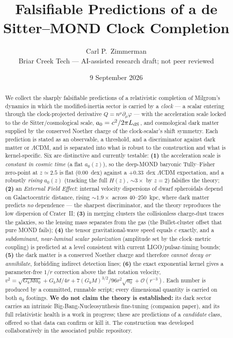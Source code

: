 \documentclass[11pt,letterpaper]{article}
\title{Falsifiable Predictions of a de Sitter--MOND Clock Completion}
\author{Carl P.\ Zimmerman\\ \small Briar Creek Tech --- AI-assisted research draft; not peer reviewed}
\date{9 September 2026}
\begin{document}
\maketitle

\begin{abstract}
We collect the sharply falsifiable predictions of a relativistic completion of Milgrom's dynamics in which
the modified-inertia sector is carried by a \emph{clock} --- a scalar entering through the clock-projected
derivative $Q=n^\mu\partial_\mu\varphi$ --- with the acceleration scale locked to the de Sitter/cosmological
scale, $a_0=c^2/2\pi L_{\rm dS}$, and cosmological dark matter supplied by the conserved Noether charge of
the clock-scalar's shift symmetry. Each prediction is stated as an observable, a threshold, and a
discriminator against dark matter or $\Lambda$CDM, and is separated into what is robust to the construction
and what is kernel-specific. Six are distinctive and currently testable: \textbf{(1)} the acceleration scale
is \emph{constant in cosmic time} (a flat $a_0(z)$), so the deep-MOND baryonic Tully--Fisher zero-point at
$z\simeq2.5$ is flat ($0.00$~dex) against a $+0.33$~dex $\Lambda$CDM expectation, and a robustly \emph{rising}
$a_0(z)$ (tracking the full $H(z)$, $\sim3\times$ by $z=2$) falsifies the theory; \textbf{(2)} an
\emph{External Field Effect}: internal velocity dispersions of dwarf spheroidals depend on Galactocentric
distance, rising $\sim\!1.9\times$ across $40$--$250$~kpc, where dark matter predicts \emph{no} dependence ---
the sharpest discriminator, and the theory reproduces the low dispersion of Crater~II; \textbf{(3)} in merging
clusters the collisionless charge-dust traces the galaxies, so the lensing mass separates from the gas (the
Bullet-cluster offset that pure MOND fails); \textbf{(4)} the tensor gravitational-wave speed equals $c$
exactly, and a \emph{subdominant, near-luminal scalar polarization} (amplitude set by the clock--metric
coupling) is predicted at a level consistent with current LIGO/pulsar-timing bounds; \textbf{(5)} the dark
matter is a conserved Noether charge and therefore \emph{cannot decay or annihilate}, forbidding indirect
detection lines; \textbf{(6)} the exact exponential kernel gives a parameter-free $1/r$ correction above the
flat rotation velocity, $v^2=\sqrt{G_bMa_0}+G_bM/4r+7(G_bM)^{3/2}/96r^2\sqrt{a_0}+\mathcal{O}(r^{-3})$. Each
number is produced by a committed, runnable script; every dimensional quantity is carried on both $a_0$
footings. \textbf{We do not claim the theory is established:} its dark sector carries an intrinsic
Big-Bang-Nucleosynthesis fine-tuning (companion paper), and its full relativistic health is a work in
progress; these are predictions of a \emph{candidate} class, offered so that data can confirm or kill it.
The construction was developed collaboratively in the associated public repository.
\end{abstract}
\end{document}
